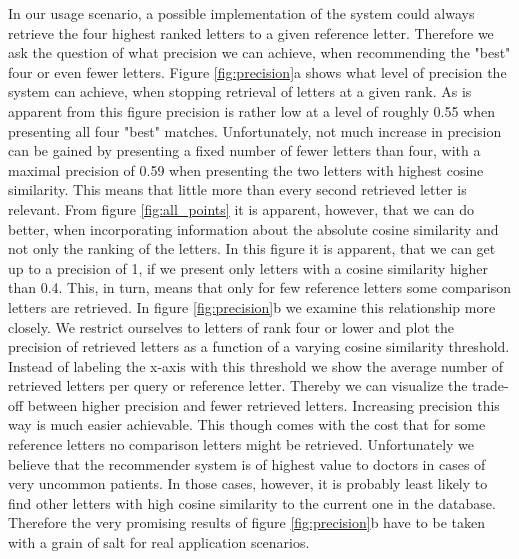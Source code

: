 In our usage scenario, a possible implementation of the system could always retrieve the four highest ranked letters to a given reference letter. Therefore we ask the question of what precision we can achieve, when recommending the "best" four or even fewer letters. Figure \ref{fig:precision}a shows what level of precision the system can achieve, when stopping retrieval of letters at a given rank. As is apparent from this figure precision is rather low at a level of roughly 0.55 when presenting all four "best" matches. Unfortunately, not much increase in precision can be gained by presenting a fixed number of fewer letters than four, with a maximal precision of 0.59 when presenting the two letters with highest cosine similarity. This means that little more than every second retrieved letter is relevant. From figure \ref{fig:all_points} it is apparent, however, that we can do better, when incorporating information about the absolute cosine similarity and not only the ranking of the letters. In this figure it is apparent, that we can get up to a precision of 1, if we present only letters with a cosine similarity higher than 0.4. This, in turn, means that only for few reference letters some comparison letters are retrieved. In figure \ref{fig:precision}b we examine this relationship more closely. We restrict ourselves to letters of rank four or lower and plot the precision of retrieved letters as a function of a varying cosine similarity threshold. Instead of labeling the x-axis with this threshold we show the average number of retrieved letters per query or reference letter. Thereby we can visualize the trade-off between higher precision and fewer retrieved letters. Increasing precision this way is much easier achievable. This though comes with the cost that for some reference letters no comparison letters might be retrieved. Unfortunately we believe that the recommender system is of highest value to doctors in cases of very uncommon patients. In those cases, however, it is probably least likely to find other letters with high cosine similarity to the current one in the database. Therefore the very promising results of figure \ref{fig:precision}b have to be taken with a grain of salt for real application scenarios.

